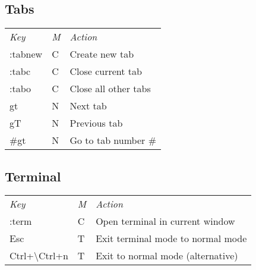 \subsection{Tabs}
	\begin{tabularx}{\tablewidth}{llX}
		\emph{Key} & \emph{M} & \emph{Action} \\
		:tabnew & C & Create new tab \\
		:tabc & C & Close current tab \\
		:tabo & C & Close all other tabs \\
		gt & N & Next tab \\
		gT & N & Previous tab \\
		\#gt & N & Go to tab number \# \\
	\end{tabularx}

\subsection{Terminal}
	\begin{tabularx}{\tablewidth}{llX}
		\emph{Key} & \emph{M} & \emph{Action} \\
		:term & C & Open terminal in current window \\
		Esc & T & Exit terminal mode to normal mode \\
		Ctrl+\textbackslash Ctrl+n & T & Exit to normal mode (alternative) \\
	\end{tabularx}
